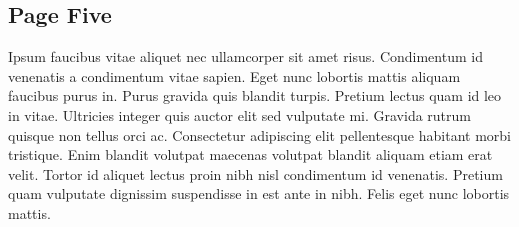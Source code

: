 \subsection{Page Five}

Ipsum faucibus vitae aliquet nec ullamcorper sit amet risus. Condimentum id venenatis a condimentum vitae sapien. Eget nunc lobortis mattis aliquam faucibus purus in. Purus gravida quis blandit turpis. Pretium lectus quam id leo in vitae. Ultricies integer quis auctor elit sed vulputate mi. Gravida rutrum quisque non tellus orci ac. Consectetur adipiscing elit pellentesque habitant morbi tristique. Enim blandit volutpat maecenas volutpat blandit aliquam etiam erat velit. Tortor id aliquet lectus proin nibh nisl condimentum id venenatis. Pretium quam vulputate dignissim suspendisse in est ante in nibh. Felis eget nunc lobortis mattis.